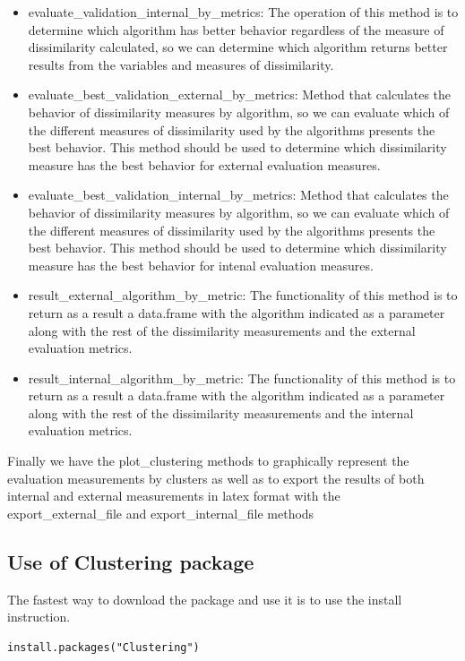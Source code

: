 \begin{itemize}
    \item evaluate\_validation\_internal\_by\_metrics: The operation of this method is to determine which algorithm has better behavior regardless of the measure of dissimilarity calculated, so we can determine which algorithm returns better results from the variables and measures of dissimilarity.
    \item evaluate\_best\_validation\_external\_by\_metrics: Method that calculates the behavior of dissimilarity measures by algorithm, so we can evaluate which of the different measures of dissimilarity used by the algorithms presents the best behavior. This method should be used to determine which dissimilarity measure has the best behavior for external evaluation measures.
    \item evaluate\_best\_validation\_internal\_by\_metrics: Method that calculates the behavior of dissimilarity measures by algorithm, so we can evaluate which of the different measures of dissimilarity used by the algorithms presents the best behavior. This method should be used to determine which dissimilarity measure has the best behavior for intenal evaluation measures.
    \item result\_external\_algorithm\_by\_metric: The functionality of this method is to return as a result a data.frame with the algorithm indicated as a parameter along with the rest of the dissimilarity measurements and the external evaluation metrics.
    \item result\_internal\_algorithm\_by\_metric: The functionality of this method is to return as a result a data.frame with the algorithm indicated as a parameter along with the rest of the dissimilarity measurements and the internal evaluation metrics.
\end{itemize}
Finally we have the plot\_clustering methods to graphically represent the evaluation measurements by clusters as well as to export the results of both internal and external measurements in latex format with the export\_external\_file and export\_internal\_file methods

\subsection{Use of Clustering package}

The fastest way to download the  package and use it is to use the install instruction.

\begin{verbatim}
install.packages("Clustering")
\end{verbatim}

